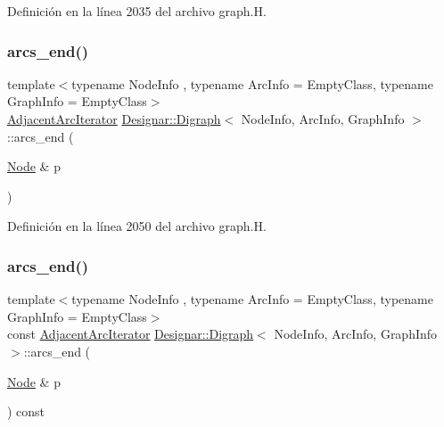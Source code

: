 Definición en la línea 2035 del archivo graph.\+H.

\mbox{\label{class_designar_1_1_digraph_ab7e47c93dd15bab0510977f403a35849}} 
\subsubsection{\texorpdfstring{arcs\+\_\+end()}{arcs\_end()}\hspace{0.1cm}{\footnotesize\ttfamily [3/4]}}
{\footnotesize\ttfamily template$<$typename Node\+Info , typename Arc\+Info  = Empty\+Class, typename Graph\+Info  = Empty\+Class$>$ \\
\hyperlink{class_designar_1_1_digraph_1_1_adjacent_arc_iterator}{Adjacent\+Arc\+Iterator} \hyperlink{class_designar_1_1_digraph}{Designar\+::\+Digraph}$<$ Node\+Info, Arc\+Info, Graph\+Info $>$\+::arcs\+\_\+end (\begin{DoxyParamCaption}\item[{\hyperlink{class_designar_1_1_digraph_a4dc921c41a480b7946a04170e997d8ae}{Node} \&}]{p }\end{DoxyParamCaption})\hspace{0.3cm}{\ttfamily [inline]}}



Definición en la línea 2050 del archivo graph.\+H.

\mbox{\label{class_designar_1_1_digraph_a68abe34d6f5a7b429715ec55aa030b7d}} 
\subsubsection{\texorpdfstring{arcs\+\_\+end()}{arcs\_end()}\hspace{0.1cm}{\footnotesize\ttfamily [4/4]}}
{\footnotesize\ttfamily template$<$typename Node\+Info , typename Arc\+Info  = Empty\+Class, typename Graph\+Info  = Empty\+Class$>$ \\
const \hyperlink{class_designar_1_1_digraph_1_1_adjacent_arc_iterator}{Adjacent\+Arc\+Iterator} \hyperlink{class_designar_1_1_digraph}{Designar\+::\+Digraph}$<$ Node\+Info, Arc\+Info, Graph\+Info $>$\+::arcs\+\_\+end (\begin{DoxyParamCaption}\item[{\hyperlink{class_designar_1_1_digraph_a4dc921c41a480b7946a04170e997d8ae}{Node} \&}]{p }\end{DoxyParamCaption}) const\hspace{0.3cm}{\ttfamily [inline]}}



